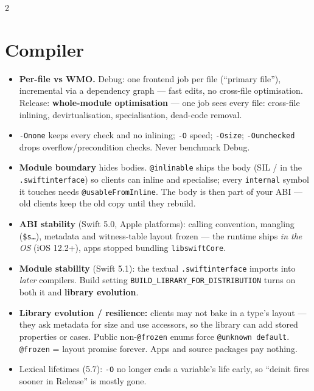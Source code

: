 \documentclass[8pt]{extarticle}
\begin{document}
\begin{multicols}{2}
\section{Compiler}
\begin{itemize}
  \item \textbf{Per-file vs WMO.} Debug: one frontend job per file
        (``primary file''), incremental via a dependency graph — fast
        edits, no cross-file optimisation. Release: \textbf{whole-module
        optimisation} — one job sees every file: cross-file inlining,
        devirtualisation, specialisation, dead-code removal.
  \item \texttt{-Onone} keeps every check and no inlining;
        \texttt{-O} speed; \texttt{-Osize}; \texttt{-Ounchecked} drops
        overflow/precondition checks. Never benchmark Debug.
  \item \textbf{Module boundary} hides bodies. \texttt{@inlinable} ships the
        body (SIL / in the \texttt{.swiftinterface}) so clients can inline and
        specialise; every \texttt{internal} symbol it touches needs
        \texttt{@usableFromInline}. The body is then part of your ABI —
        old clients keep the old copy until they rebuild.
  \item \textbf{ABI stability} (Swift 5.0, Apple platforms): calling
        convention, mangling (\texttt{\$s…}), metadata and witness-table
        layout frozen — the runtime ships \emph{in the OS} (iOS 12.2+), apps
        stopped bundling \texttt{libswiftCore}.
  \item \textbf{Module stability} (Swift 5.1): the textual
        \texttt{.swiftinterface} imports into \emph{later} compilers. Build
        setting \texttt{BUILD\_LIBRARY\_FOR\_\allowbreak DISTRIBUTION} turns on both it and
        \textbf{library evolution}.
  \item \textbf{Library evolution / resilience:} clients may not bake in a
        type's layout — they ask metadata for size and use accessors, so the
        library can add stored properties or cases. Public non-\texttt{@frozen}
        enums force \texttt{@unknown default}. \texttt{@frozen} = layout
        promise forever. Apps and source packages pay nothing.
  \item Lexical lifetimes (5.7): \texttt{-O} no longer ends a variable's life
        early, so ``deinit fires sooner in Release'' is mostly gone.
\end{itemize}


\end{multicols}
\end{document}
